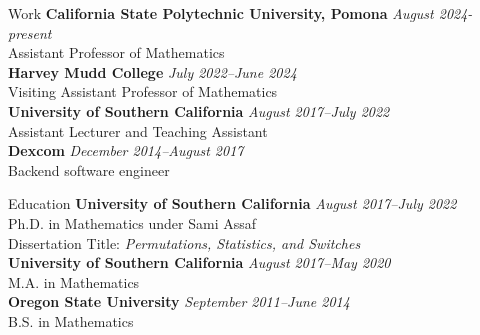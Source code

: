 \documentclass{cv} %
\date{\today}
\begin{document}

\begin{rSection}{Work}
  \textbf{California State Polytechnic University, Pomona} \hfill {\em August 2024-present}
  \\ Assistant Professor of Mathematics
  \\
  \textbf{Harvey Mudd College} \hfill {\em July 2022--June 2024}
  \\ Visiting Assistant Professor of Mathematics
  \\
  \textbf{University of Southern California} \hfill {\em August 2017--July 2022}
  \\ Assistant Lecturer and Teaching Assistant
  \\ \textbf{Dexcom} \hfill {\em December 2014--August 2017}
  \\ Backend software engineer
\end{rSection}

\begin{rSection}{Education}
  \textbf{University of Southern California} \hfill {\em August 2017--July 2022}
  \\ Ph.D. in Mathematics under Sami Assaf
  \\ Dissertation Title: \textit{Permutations, Statistics, and Switches}
  \\
  \textbf{University of Southern California} \hfill {\em August 2017--May 2020}
  \\ M.A. in Mathematics
  \\
  \textbf{Oregon State University} \hfill {\em September 2011--June 2014}
  \\ B.S. in Mathematics
\end{rSection}
\end{document}

